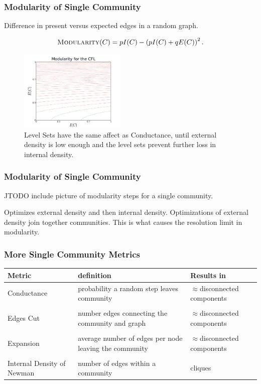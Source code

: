 \documentclass{beamer}
\begin{document}
\begin{frame}\frametitle{Modularity of  Single Community}
Difference in present versus expected edges in a random graph.
\begin{block}{}
\begin{center}
\begin{equation}
\mbox{\sc Modularity}(C) = p I(C) - \left(p I(C) + q E(C)\right)^2.\nonumber
\end{equation}
\end{center}
\end{block}
\begin{figure}
\includegraphics[width=2in]{Figures/modularity_ls}
\caption{Level Sets have the same affect as Conductance, until external density is low enough and the level sets prevent further loss in internal density.}
\end{figure}
\end{frame}



\begin{frame}\frametitle{Modularity of  Single Community}

JTODO include picture of modularity steps for a single community.

Optimizes external density and then internal density.  Optimizations of external density join together communities.  This is what causes the resolution limit in modularity.

\end{frame}

\begin{frame}\frametitle{More Single Community Metrics}

\begin{table}[t]
\centering
\begin{tabular}{p{1.5in}| p{1.5in} p{1.2in}}
Metric & definition & Results in \\ \hline
{\sc Conductance} & probability a random step leaves community & $\approx$disconnected components \\
&& \\ \hline
{\sc Edges Cut} & number edges connecting the community and graph & $\approx$disconnected components \\ && \\ \hline
{\sc Expansion} & average number of edges per node leaving the community & $\approx$disconnected components \\ && \\ \hline
{\sc Internal Density of Newman} & number of edges within a community & cliques
\end{tabular}
\end{table}

\end{frame}
\end{document}
